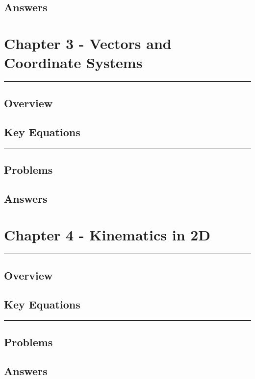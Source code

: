 \documentclass[a4paper,12pt]{article}
\begin{document}
\subsection*{Answers}


\pagebreak
\section*{Chapter 3 - Vectors and Coordinate Systems}
\rule{\linewidth}{1pt}
\subsection*{Overview}
\subsection*{Key Equations}

\begin{center}
  \rule{6cm}{0.5pt}
\end{center}
\subsection*{Problems}
\subsection*{Answers}

\pagebreak
\section*{Chapter 4 - Kinematics in 2D}
\rule{\linewidth}{1pt}
\subsection*{Overview}
\subsection*{Key Equations}

\begin{center}
  \rule{6cm}{0.5pt}
\end{center}
\subsection*{Problems}
\subsection*{Answers}
\end{document}
